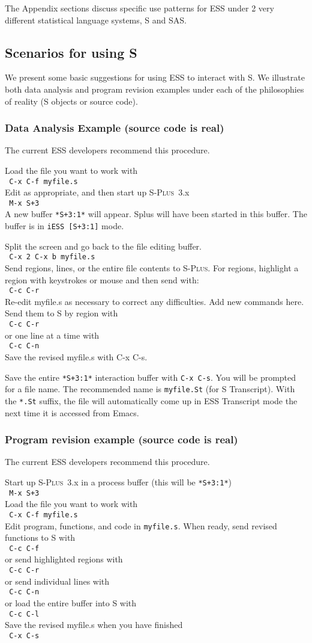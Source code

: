 \documentclass{article}
\newcommand*{\Splus}{\textsc{S-Plus}}
\newcommand{\elcode}[1]{\\{\texttt{\hspace*{2em} #1}}\\}
\begin{document}
The Appendix sections discuss specific use patterns for ESS under 2 very
different statistical language systems, S and SAS.

\subsection{Scenarios for using S}
\label{sec:S:scenarios}

We present some basic suggestions for using ESS to interact with S.
We illustrate both data analysis and program revision examples under each of
the philosophies of reality (S objects or source code).

\subsubsection{Data Analysis Example (source code is real)}
The current ESS developers recommend this procedure.

\noindent
Load the file you want to work with
  \elcode{C-x C-f myfile.s}
Edit as appropriate, and then start up \Splus~3.x
  \elcode{M-x S+3}
A new buffer \texttt{*S+3:1*} will appear.  Splus will have been started
in this buffer.  The buffer is in \texttt{iESS [S+3:1]} mode.

Split the screen and go back to the file editing buffer.
  \elcode{C-x 2 C-x b myfile.s}
Send regions, lines, or the entire file contents to \Splus.
For regions, highlight a region with keystrokes or mouse
and then send with:
  \elcode{C-c C-r}
Re-edit myfile.s as necessary to correct any difficulties.  Add
new commands here.  Send them to S by region with
  \elcode{C-c C-r}
or one line at a time with
  \elcode{C-c C-n}
Save the revised myfile.s with C-x C-s.

Save the entire \texttt{*S+3:1*} interaction buffer with \texttt{C-x C-s}.  You
will be prompted for a file name.  The recommended name is
\texttt{myfile.St} (for S Transcript).  With the \texttt{*.St} suffix,
the file will automatically come up in ESS
Transcript mode the next time it is accessed from Emacs.


\subsubsection{Program revision example (source code is real)}
The current ESS developers recommend this procedure.

\noindent
Start up \Splus~3.x in a process buffer (this will be \texttt{*S+3:1*})
  \elcode{M-x S+3}
Load the file you want to work with
  \elcode{C-x C-f myfile.s}
Edit program, functions, and code in \texttt{myfile.s}.
When ready, send revised functions to S with
  \elcode{C-c C-f}
or send highlighted regions with
  \elcode{C-c C-r}
or send individual lines with
  \elcode{C-c C-n}
or load the entire buffer into S with
  \elcode{C-c C-l}
Save the revised myfile.s when you have finished
  \elcode{C-x C-s}
\end{document}
